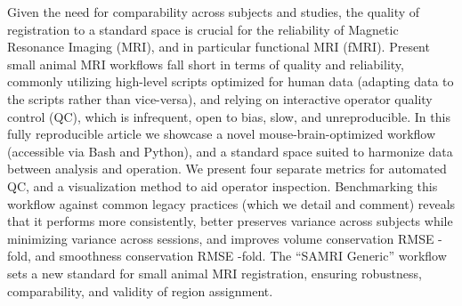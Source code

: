 Given the need for comparability across subjects and studies, the quality of registration to a standard space is crucial for the reliability of Magnetic Resonance Imaging (MRI), and in particular functional MRI (fMRI).
Present small animal MRI workflows fall short in terms of quality and reliability, commonly utilizing high-level scripts optimized for human data (adapting data to the scripts rather than vice-versa), and relying on interactive operator quality control (QC), which is infrequent, open to bias, slow, and unreproducible.
In this fully reproducible article we showcase a novel mouse-brain-optimized workflow (accessible via Bash and Python), and a standard space suited to harmonize data between analysis and operation.
We present four separate metrics for automated QC, and a visualization method to aid operator inspection.
Benchmarking this workflow against common legacy practices (which we detail and comment) reveals that it performs more consistently, better preserves variance across subjects while minimizing variance across sessions, and improves volume conservation RMSE
-fold,
and smoothness conservation RMSE
-fold.
The “SAMRI Generic” workflow sets a new standard for small animal MRI registration, ensuring robustness, comparability, and validity of region assignment.
